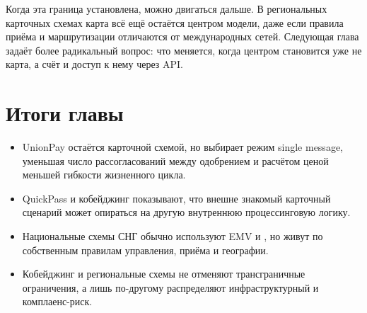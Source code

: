 Когда эта граница установлена, можно двигаться дальше. В региональных
карточных схемах карта всё ещё остаётся центром модели, даже если
правила приёма и маршрутизации отличаются от международных сетей.
Следующая глава задаёт более радикальный вопрос: что меняется, когда
центром становится уже не карта, а счёт и доступ к нему через API.

\section*{Итоги главы}

\begin{itemize}
  \item UnionPay остаётся карточной схемой, но выбирает режим single message, уменьшая число рассогласований между одобрением и
        расчётом ценой меньшей гибкости жизненного цикла.
  \item QuickPass и кобейджинг показывают, что внешне знакомый карточный сценарий может опираться на другую внутреннюю
        процессинговую логику.
  \item Национальные схемы СНГ обычно используют EMV и ,
        но живут по собственным правилам управления, приёма и географии.
  \item Кобейджинг и региональные схемы не отменяют трансграничные
        ограничения, а лишь по-другому распределяют инфраструктурный
        и комплаенс-риск.
\end{itemize}
